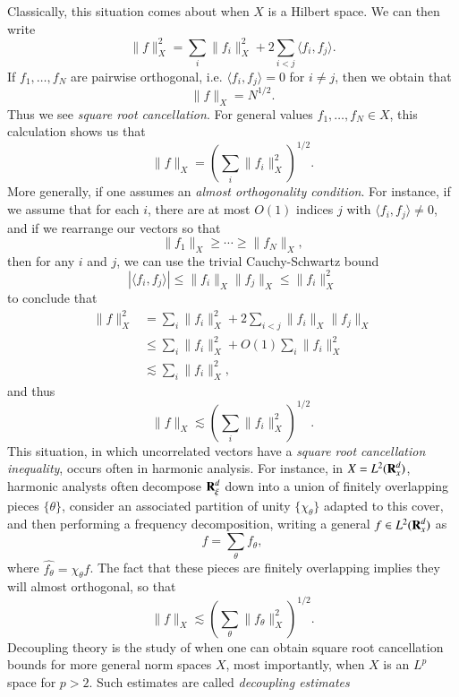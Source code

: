 Classically, this situation comes about when $X$ is a Hilbert space. We can then write
%
\[ \| f \|_X^2 = \sum_i \| f_i \|_X^2 + 2 \sum_{i < j} \langle f_i, f_j \rangle. \]
%
If $f_1,\dots,f_N$ are pairwise orthogonal, i.e. $\langle f_i, f_j \rangle = 0$ for $i \neq j$, then we obtain that
%
\[ \| f \|_X = N^{1/2}. \]
%
Thus we see \emph{square root cancellation}. For general values $f_1,\dots, f_N \in X$, this calculation shows us that
%
\[ \| f \|_X = \left( \sum_i \| f_i \|_X^2 \right)^{1/2}. \]
%
More generally, if one assumes an \emph{almost orthogonality condition}. For instance, if we assume that for each $i$, there are at most $O(1)$ indices $j$ with $\langle f_i, f_j \rangle \neq 0$, and if we rearrange our vectors so that
%
\[ \| f_1 \|_X \geq \cdots \geq \| f_N \|_X, \]
%
then for any $i$ and $j$, we can use the trivial Cauchy-Schwartz bound
%
\[ |\langle f_i, f_j \rangle| \leq \| f_i \|_X \| f_j \|_X \leq \| f_i \|_X^2 \]
%
to conclude that
%
\begin{align*}
  \| f \|_X^2 &= \sum_i \| f_i \|_X^2 + 2 \sum_{i < j} \| f_i \|_X \| f_j \|_X\\
  &\leq \sum_i \| f_i \|_X^2 + O(1) \sum_i \| f_i \|_X^2\\
  &\lesssim \sum_i \| f_i \|_X^2,
\end{align*}
%
and thus
%
\[ \| f \|_X \lesssim \left( \sum_i \| f_i \|_X^2 \right)^{1/2}. \]
%
This situation, in which uncorrelated vectors have a \emph{square root cancellation inequality}, occurs often in harmonic analysis. For instance, in $X = L^2(\operatorname{\mathbf{R}}^d_x)$, harmonic analysts often decompose $\operatorname{\mathbf{R}}^d_\xi$ down into a union of finitely overlapping pieces $\{ \theta \}$, consider an associated partition of unity $\{ \chi_\theta \}$ adapted to this cover, and then performing a frequency decomposition, writing a general $f \in L^2(\operatorname{\mathbf{R}}^d_x)$ as
%
\[ f = \sum_\theta f_\theta, \]
%
where $\widehat{f_\theta} = \chi_\theta \widehat{f}$. The fact that these pieces are finitely overlapping implies they will almost orthogonal, so that
%
\[ \| f \|_X \lesssim \left( \sum_\theta \| f_\theta \|_X^2 \right)^{1/2}. \]
%
Decoupling theory is the study of when one can obtain square root cancellation bounds for more general norm spaces $X$, most importantly, when $X$ is an $L^p$ space for $p > 2$. Such estimates are called \emph{decoupling estimates}

